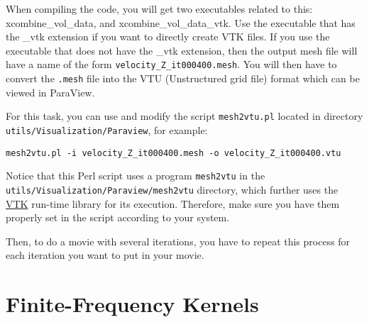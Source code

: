 When compiling the code, you will get two executables related to this: xcombine\_vol\_data, and xcombine\_vol\_data\_vtk.
Use the executable that has the \_vtk extension if you want to directly create VTK files.
If you use the executable that does not have the \_vtk extension, then the output mesh file will have a name of the form \texttt{velocity\_Z\_it000400.mesh}.
You will then have to convert the \texttt{.mesh} file into the VTU (Unstructured grid file) format which can be viewed in ParaView.\newline

\noindent
For this task, you can use and modify the
script \texttt{mesh2vtu.pl} located in directory \texttt{\small utils/Visualization/Paraview}, for example:

{\footnotesize
\begin{verbatim}
mesh2vtu.pl -i velocity_Z_it000400.mesh -o velocity_Z_it000400.vtu
\end{verbatim}
}

Notice that this Perl script uses a program \texttt{mesh2vtu} in the \texttt{utils/Visualization/Paraview/mesh2vtu} directory, which further
uses the \href{http://www.vtk.org}{VTK} run-time library for its execution. Therefore, make sure you have them properly set
in the script according to your system.\newline

\bigskip

Then, to do a movie with several iterations, you have to repeat this process for each iteration you want to put in your movie.

\section{Finite-Frequency Kernels}\label{sec:Finite-Frequency-Kernels}

